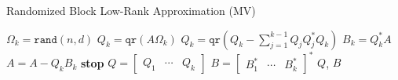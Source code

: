 \begin{algorithm}[p]
\caption{Randomized Block Low-Rank Approximation (MV)
    \cite[Figure 2]{martinsson2016randomized}}
\label{alg:rand_low_rank_MV}
\begin{algorithmic}[1]
        \State $\Omega_{k} = \texttt{rand}(n,d)$
        \State $Q_{k} = \texttt{qr}(A\Omega_{k})$
        \State $Q_{k} = \texttt{qr}(Q_{k}-\sum_{j=1}^{k-1}Q_{j}Q_{j}^{*}Q_{k})$
            \label{alg_line:rand_MV_GS}
        \State $B_{k} = Q_{k}^{*}A$
        \State $A = A - Q_{k}B_{k}$
            \State \textbf{stop}
        \EndIf
    \EndFor
\State $Q = \begin{bmatrix} Q_{1} & \cdots & Q_{k} \end{bmatrix}$
\State $B = \begin{bmatrix} B_{1}^{*} & \cdots & B_{k}^{*} \end{bmatrix}^{*}$
\State \Return $Q$, $B$
\EndFunction
\end{algorithmic}
\end{algorithm}

